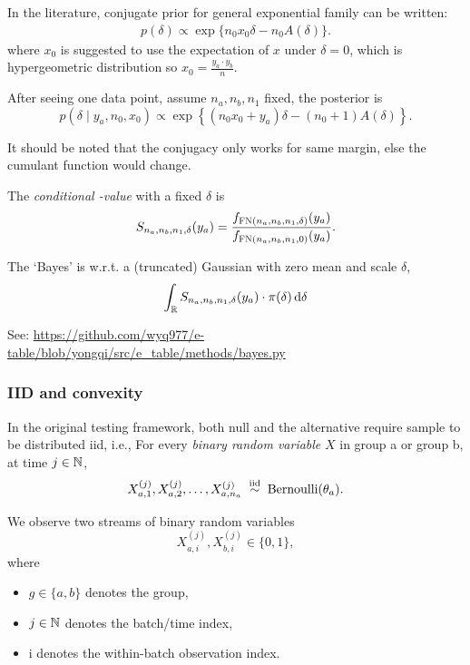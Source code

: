 In the literature, conjugate prior for general exponential family can be written:
\begin{align*}
	p(\delta) \propto \exp\{n_0x_0 \delta - n_0 A(\delta)\}.
\end{align*}
where $x_0$ is suggested to use the expectation of $x$ under $\delta=0$,
which is hypergeometric distribution so $x_0=\frac{y_a\cdot y_b}{n}$.

After seeing one data point, assume $n_a,n_b,n_1$ fixed,
the posterior is
$$
    p(\delta\mid y_a,n_0,x_0)
    \propto
    \exp\left\{
        (n_0x_0+y_a)\delta - (n_0+1)A(\delta)
    \right\}.
$$

It should be noted that the conjugacy only works for same margin,
else the cumulant function would change.



The \emph{conditional \E-value} with a fixed $\delta$ is
\begin{equation*}
	S_{n_a,n_b,n_1,\delta}(y_a) = \frac{f_{\textsc{FN}(n_a,n_b,n_1,\delta)}(y_a)}{f_{\textsc{FN}(n_a,n_b,n_1,0)}(y_a)}.
\end{equation*}


The `Bayes' is w.r.t. a (truncated) Gaussian with zero mean and scale $\delta$,
\begin{equation*}
	\int_{\Rf} S_{n_a,n_b,n_1,\delta}(y_a) \cdot \pi(\delta) \dd{\delta}
\end{equation*}

See: \url{https://github.com/wyq977/e-table/blob/yongqi/src/e_table/methods/bayes.py}

\subsubsection{IID and convexity}

In the original testing framework,
both null and the alternative require sample to be distributed iid,
i.e.,
For every \emph{binary random variable} $X$ in group a or group b,
at time $j\in\mathbb{N}$,
$$
X_{a,1}^{(j)},X_{a,2}^{(j)},\dots,X_{a,n_a}^{(j)}\; \overset{\mathrm{iid}}{\sim} \; \mathrm{Bernoulli}(\theta_a).
$$

We observe two streams of binary random variables
$$
X_{a,i}^{(j)}, X_{b,i}^{(j)} \in \{0,1\},
$$
where
\begin{itemize}
	\item $g \in \{a,b\}$ denotes the group,
	\item $j \in \mathbb{N}$ denotes the batch/time index,
	\item i denotes the within-batch observation index.
\end{itemize}


